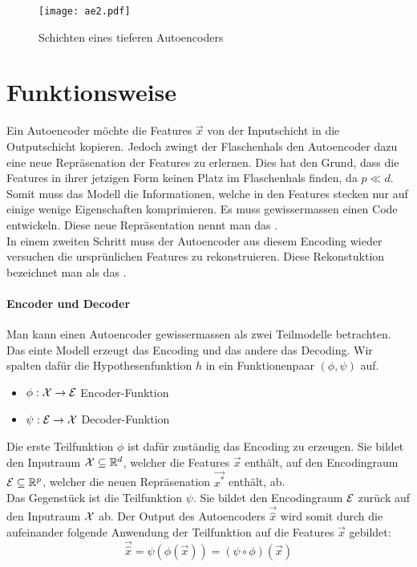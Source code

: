 \begin{figure}[h!]
  \centering
  \texttt{[image: ae2.pdf]}
  \caption{Schichten eines tieferen Autoencoders}
  \label{fig:big_autoencoder}
\end{figure}

\section{Funktionsweise}
Ein Autoencoder möchte die Features $\vec{x}$ von der Inputschicht in die
Outputschicht kopieren. Jedoch zwingt der Flaschenhals den Autoencoder dazu eine
neue Repräsenation der Features zu erlernen. Dies hat den Grund, dass die
Features in ihrer jetzigen Form keinen Platz im Flaschenhals finden, da $p \ll d$.
Somit muss das Modell die Informationen, welche in den Features stecken
nur auf einige wenige Eigenschaften komprimieren. Es muss gewissermassen einen
Code entwickeln. Diese neue Repräsentation nennt man das . \\
In einem zweiten Schritt muss der Autoencoder aus diesem Encoding wieder
versuchen die ursprünlichen Features zu rekonstruieren. Diese Rekonstuktion
bezeichnet man als das .

\paragraph{Encoder und Decoder}
Man kann einen Autoencoder gewissermassen als zwei Teilmodelle betrachten. Das
einte Modell erzeugt das Encoding und das andere das Decoding. Wir spalten
dafür die Hypothesenfunktion $h$ in ein Funktionenpaar $(\phi,\psi)$ auf.
\begin{itemize}
\item{$\phi: \mathcal{X} \to \mathcal{E}$ Encoder-Funktion}
\item{$\psi: \mathcal{E} \to \mathcal{X}$ Decoder-Funktion}
\end{itemize}
Die erste Teilfunktion $\phi$ ist dafür zuständig das Encoding zu erzeugen. Sie
bildet den Inputraum $\mathcal{X} \subseteq \mathbb{R}^d$, welcher die Features $\vec{x}$ enthält, auf
den Encodingraum $\mathcal{E} \subseteq \mathbb{R}^p$, welcher die neuen
Repräsenation $\vec{x^*}$ enthält, ab. \\
Das Gegenstück ist die Teilfunktion $\psi$. Sie bildet den Encodingraum
$\mathcal{E}$ zurück auf den Inputraum $\mathcal{X}$ ab.
\para{}
Der Output des Autoencoders $\vec{\hat{x}}$ wird somit durch die aufeinander
folgende Anwendung der Teilfunktion auf die Features $\vec{x}$ gebildet:
\begin{equation}
  \vec{\hat{x}} = \psi(\phi(\vec{x})) = (\psi \circ \phi)(\vec{x})
\end{equation}

